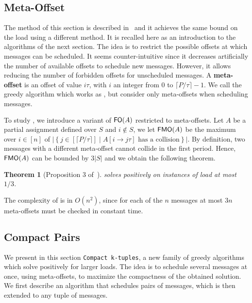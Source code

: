 \documentclass[pdflatex,sn-mathphys,iicol]{sn-jnl}%
\theoremstyle{thmstyleone}%
\newtheorem{theorem}{Theorem}%
\theoremstyle{thmstyletwo}%
\theoremstyle{thmstylethree}%
\begin{document}
\subsection{Meta-Offset}

The method of this section is described in~\cite{bartharxiv2018deterministic} and it achieves the same bound on the load using a different method. It is recalled here as an introduction to the algorithms of the next section.
The idea is to restrict the possible offsets at which messages can be scheduled. It seems counter-intuitive since it decreases artificially the number of available offsets to schedule new messages. However, it allows reducing the number of forbidden offsets for unscheduled messages. A \textbf{meta-offset} is an offset of value $i\tau$,
with $i$ an integer from $0$ to $\lceil P / \tau \rceil - 1$. We call \metaoffset the greedy algorithm which works as \firstfit, but consider only meta-offsets when scheduling messages. 

To study \metaoffset, we introduce a variant of $\textsf{FO}(A)$ restricted to meta-offsets.
 Let $A$ be a partial assignment defined over $S$ and $i\notin S$, we let $\textsf{FMO}(A)$ be the maximum over $i \in [n]$ of $\lvert\left\{ j \in [\lceil P / \tau \rceil] \mid A[i \rightarrow j\tau] \text{ has a collision}\right\}\rvert$.
 By definition, two messages with a different meta-offset cannot collide in the first period. Hence, $\textsf{FMO}(A)$ can be bounded by $3\lvert S\rvert$ and we obtain the following theorem.


\begin{theorem}[Proposition 3 of~\cite{bartharxiv2018deterministic}]\label{th:metaoffset}
\metaoffset solves \pma positively on instances of load at most $1/3$.
\end{theorem}

The complexity of \metaoffset is in $O(n^2)$, since for each of the $n$ messages at most $3n$ meta-offsets must be checked in constant time. 

\subsection{Compact Pairs}

We present in this section \texttt{Compact k-tuples}, a new family of greedy algorithms which solve \pma positively for larger loads. The idea is to schedule several messages at once, using meta-offsets, to maximize the compactness of the obtained solution. We first describe an algorithm that schedules pairs of messages, which is then extended to any tuple of messages. 
\end{document}
